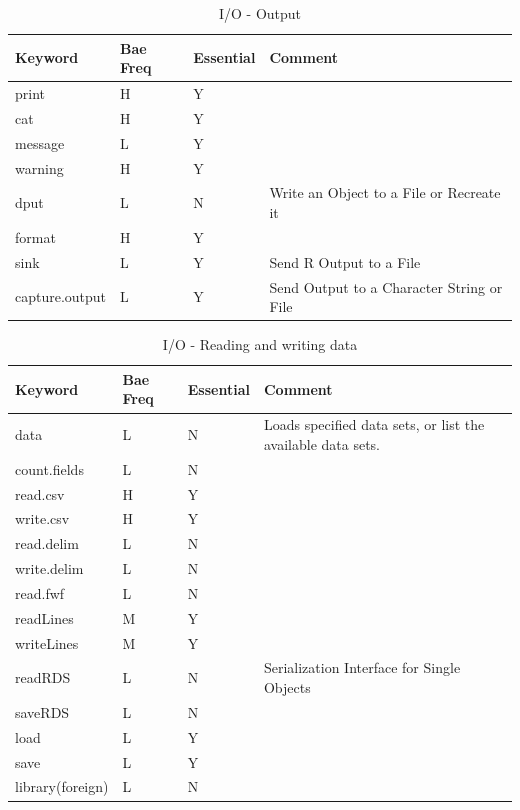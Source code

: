 \documentclass[11pt,]{krantz}
\theoremstyle{definition}
\theoremstyle{definition}
\theoremstyle{remark}
\begin{document}
\begin{table}

\caption{\label{tab:knitchunk24}I/O - Output}
\centering
\begin{tabular}[t]{llll}
\toprule
Keyword & Bae Freq & Essential & Comment\\
\midrule
print & H & Y & \\
cat & H & Y & \\
message & L & Y & \\
warning & H & Y & \\
dput & L & N & Write an Object to a File or Recreate it\\
\addlinespace
format & H & Y & \\
sink & L & Y & Send R Output to a File\\
capture.output & L & Y & Send Output to a Character String or File\\
\bottomrule
\end{tabular}
\end{table}

\begin{table}

\caption{\label{tab:knitchunk25}I/O - Reading and writing data}
\centering
\begin{tabular}[t]{llll}
\toprule
Keyword & Bae Freq & Essential & Comment\\
\midrule
data & L & N & Loads specified data sets, or list the available data sets.\\
count.fields & L & N & \\
read.csv & H & Y & \\
write.csv & H & Y & \\
read.delim & L & N & \\
\addlinespace
write.delim & L & N & \\
read.fwf & L & N & \\
readLines & M & Y & \\
writeLines & M & Y & \\
readRDS & L & N & Serialization Interface for Single Objects\\
\addlinespace
saveRDS & L & N & \\
load & L & Y & \\
save & L & Y & \\
library(foreign) & L & N & \\
\bottomrule
\end{tabular}
\end{table}
\end{document}
